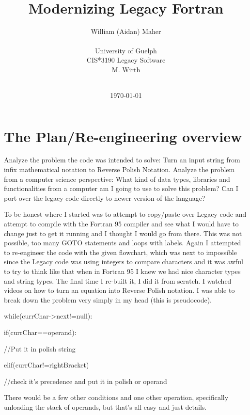 \documentclass[a4paper,12pt]{article}
\title{\\Modernizing Legacy Fortran}
\author{
William (Aidan) Maher
\\\\
University of Guelph\\
CIS*3190 Legacy Software\\
M. Wirth\\\
}
\date{\today}
\begin{document}
\clearpage\maketitle
\thispagestyle{empty}
\pagebreak
{}

\section{The Plan/Re-engineering overview}
\small
Analyze the problem the code was intended to solve: Turn an input string from infix mathematical notation to Reverse Polish Notation. Analyze the problem from a computer science perspective: What kind of data types, libraries and functionalities from a computer am I going to use to solve this problem? Can I port over the legacy code directly to newer version of the language?

	To be honest where I started was to attempt to copy/paste over Legacy code and attempt to compile with the Fortran 95 compiler and see what I would have to change just to get it running and I thought I would go from there. This was not possible, too many GOTO statements and loops with labels. 
	Again I attempted to re-engineer the code with the given flowchart, which was next to impossible since the Legacy code was using integers to compare characters and it was awful to try to think like that when in Fortran 95 I knew we had nice character types and string types.
	The final time I re-built it, I did it from scratch. I watched videos on how to turn an equation into Reverse Polish notation. I was able to break down the problem very simply in my head (this is pseudocode).\\
	
\raggedright while(currChar-\textgreater next!=null):

\hspace{10 mm} if(currChar==operand):

\hspace{20 mm} //Put it in polish string

\hspace{10 mm} elif(currChar!=rightBracket)

\hspace{20 mm} //check it's precedence and put it in polish or operand \\
\vspace{1cm}

\hspace{10 mm} There would be a few other conditions and one other operation, specifically unloading the stack of operands, but that's all easy and just details. 
\end{document}

